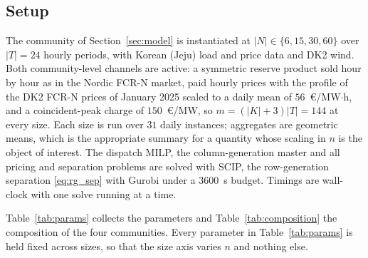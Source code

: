 
\subsection{Setup}
\label{sec:setup}
The community of Section~\ref{sec:model} is instantiated at $|N|\in\{6,15,30,60\}$ over
$|T|=24$ hourly periods, with Korean (Jeju) load and price data and DK2 wind. Both
community-level channels are active: a symmetric reserve product sold hour by hour as
in the Nordic FCR-N market, paid hourly prices with the profile of the DK2 FCR-N
prices of January 2025 scaled to a daily mean of $56$~\euro/MW$\cdot$h, and a coincident-peak charge of
$150$~\euro/MW, so $m=(|K|+3)|T|=144$ at every size. Each size is run over $31$ daily
instances; aggregates are geometric means, which is the appropriate summary for a
quantity whose scaling in $n$ is the object of interest. The dispatch MILP, the
column-generation master and all pricing and separation problems are solved with SCIP,
the row-generation separation \eqref{eq:rg_sep} with Gurobi under a $3600$~s budget.
Timings are wall-clock with one solve running at a time.

Table~\ref{tab:params} collects the parameters and Table~\ref{tab:composition} the
composition of the four communities. Every parameter in Table~\ref{tab:params} is held
fixed across sizes, so that the size axis varies $n$ and nothing else.

